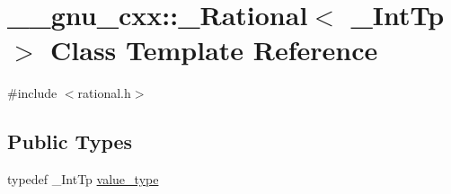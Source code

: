 \hypertarget{class____gnu__cxx_1_1__Rational}{}\section{\+\_\+\+\_\+gnu\+\_\+cxx\+:\+:\+\_\+\+Rational$<$ \+\_\+\+Int\+Tp $>$ Class Template Reference}
\label{class____gnu__cxx_1_1__Rational}


{\ttfamily \#include $<$rational.\+h$>$}

\subsection*{Public Types}
\begin{DoxyCompactItemize}
\item 
typedef \+\_\+\+Int\+Tp \hyperlink{class____gnu__cxx_1_1__Rational_a7987be70fc59d0d980621fd65828b74a}{value\+\_\+type}
\end{DoxyCompactItemize}

